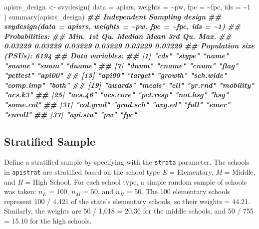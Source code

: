 \documentclass[
]{book}
\newenvironment{Shaded}{\begin{snugshade}}{\end{snugshade}}
\newcommand{\AttributeTok}[1]{\textcolor[rgb]{0.77,0.63,0.00}{#1}}
\newcommand{\DecValTok}[1]{\textcolor[rgb]{0.00,0.00,0.81}{#1}}
\newcommand{\DocumentationTok}[1]{\textcolor[rgb]{0.56,0.35,0.01}{\textbf{\textit{#1}}}}
\newcommand{\FunctionTok}[1]{\textcolor[rgb]{0.00,0.00,0.00}{#1}}
\newcommand{\NormalTok}[1]{#1}
\newcommand{\OtherTok}[1]{\textcolor[rgb]{0.56,0.35,0.01}{#1}}
\newcommand{\SpecialCharTok}[1]{\textcolor[rgb]{0.00,0.00,0.00}{#1}}
\theoremstyle{definition}
\theoremstyle{definition}
\theoremstyle{definition}
\theoremstyle{definition}
\theoremstyle{remark}
\begin{document}
\begin{Shaded}
\begin{Highlighting}[]
\NormalTok{apisrs\_design }\OtherTok{\textless{}{-}} \FunctionTok{svydesign}\NormalTok{(}
  \AttributeTok{data =}\NormalTok{ apisrs, }
  \AttributeTok{weights =} \SpecialCharTok{\textasciitilde{}}\NormalTok{pw, }
  \AttributeTok{fpc =} \SpecialCharTok{\textasciitilde{}}\NormalTok{fpc, }
  \AttributeTok{ids =} \SpecialCharTok{\textasciitilde{}}\DecValTok{1}
\NormalTok{)}
\FunctionTok{summary}\NormalTok{(apisrs\_design)}
\DocumentationTok{\#\# Independent Sampling design}
\DocumentationTok{\#\# svydesign(data = apisrs, weights = \textasciitilde{}pw, fpc = \textasciitilde{}fpc, ids = \textasciitilde{}1)}
\DocumentationTok{\#\# Probabilities:}
\DocumentationTok{\#\#    Min. 1st Qu.  Median    Mean 3rd Qu.    Max. }
\DocumentationTok{\#\# 0.03229 0.03229 0.03229 0.03229 0.03229 0.03229 }
\DocumentationTok{\#\# Population size (PSUs): 6194 }
\DocumentationTok{\#\# Data variables:}
\DocumentationTok{\#\#  [1] "cds"      "stype"    "name"     "sname"    "snum"     "dname"   }
\DocumentationTok{\#\#  [7] "dnum"     "cname"    "cnum"     "flag"     "pcttest"  "api00"   }
\DocumentationTok{\#\# [13] "api99"    "target"   "growth"   "sch.wide" "comp.imp" "both"    }
\DocumentationTok{\#\# [19] "awards"   "meals"    "ell"      "yr.rnd"   "mobility" "acs.k3"  }
\DocumentationTok{\#\# [25] "acs.46"   "acs.core" "pct.resp" "not.hsg"  "hsg"      "some.col"}
\DocumentationTok{\#\# [31] "col.grad" "grad.sch" "avg.ed"   "full"     "emer"     "enroll"  }
\DocumentationTok{\#\# [37] "api.stu"  "pw"       "fpc"}
\end{Highlighting}
\end{Shaded}

\hypertarget{stratified-sample}{%
\subsection{Stratified Sample}\label{stratified-sample}}

Define a stratified sample by specifying with the \texttt{strata} parameter. The schools in \texttt{apistrat} are stratified based on the school type \emph{E} = Elementary, \emph{M} = Middle, and \emph{H} = High School. For each school type, a simple random sample of schools was taken: \(n_E\) = 100, \(n_M\) = 50, and \(n_H\) = 50. The 100 elementary schools represent 100 / 4,421 of the state's elementary schools, so their weights = 44.21. Similarly, the weights are 50 / 1,018 = 20.36 for the middle schools, and 50 / 755 = 15.10 for the high schools.
\end{document}
